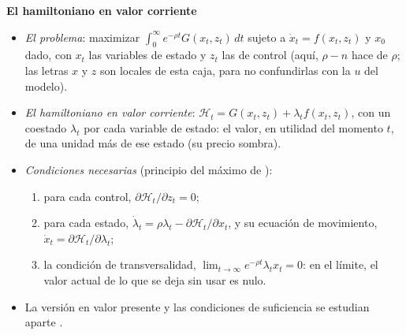 \documentclass[11pt]{article}
\begin{document}
\begin{anotaciones}
\textbf{El hamiltoniano en valor corriente} 
\begin{itemize}
\item \emph{El problema}: maximizar $\int_0^{\infty}e^{-\rho t}G(x_t,z_t)\,dt$ sujeto a $\dot x_t=f(x_t,z_t)$ y $x_0$ dado, con $x_t$ las variables de estado y $z_t$ las de control (aquí, $\rho-n$ hace de $\rho$; las letras $x$ y $z$ son locales de esta caja, para no confundirlas con la $u$ del modelo).
\item \emph{El hamiltoniano en valor corriente}: $\mathcal H_t=G(x_t,z_t)+\lambda_tf(x_t,z_t)$, con un coestado $\lambda_t$ por cada variable de estado: el valor, en utilidad del momento $t$, de una unidad más de ese estado (su precio sombra).
\item \emph{Condiciones necesarias} (principio del máximo de ):
  \begin{enumerate}
  \item para cada control, $\partial\mathcal H_t/\partial z_t=0$;
  \item para cada estado, $\dot\lambda_t=\rho\lambda_t-\partial\mathcal H_t/\partial x_t$, y su ecuación de movimiento, $\dot x_t=\partial\mathcal H_t/\partial\lambda_t$;
  \item la condición de transversalidad, $\lim_{t\to\infty}e^{-\rho t}\lambda_tx_t=0$: en el límite, el valor actual de lo que se deja sin usar es nulo.
  \end{enumerate}
\item La versión en valor presente y las condiciones de suficiencia se estudian aparte .
\end{itemize}
\end{anotaciones}
\end{document}

